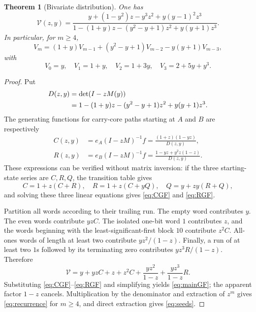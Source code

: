 \documentclass[11pt]{article}
\newtheorem{theorem}{Theorem}[section]
\theoremstyle{definition}\newtheorem{definition}[theorem]{Definition}
\theoremstyle{remark}\newtheorem{remark}[theorem]{Remark}
\begin{document}
\begin{theorem}[Bivariate distribution]\label{thm:GF}
One has
\begin{equation}\label{eq:mainGF}
 \boxed{\quad
 \mathcal V(z,y)=
 \frac{y+(1-y^2)z-y^3z^2+y(y-1)^2z^3}
 {1-(1+y)z-(y^2-y+1)z^2+y(y+1)z^3}.
 \quad}
\end{equation}
In particular, for $m\geq4$,
\begin{equation}\label{eq:recurrence}
 V_m=(1+y)V_{m-1}+(y^2-y+1)V_{m-2}-y(y+1)V_{m-3},
\end{equation}
with
\begin{equation}\label{eq:seeds}
 V_0=y,\quad V_1=1+y,\quad V_2=1+3y,\quad V_3=2+5y+y^3.
\end{equation}
\end{theorem}
\begin{proof}
Put
\begin{align}
 D(z,y)&=\det(I-zM(y))\notag\\
 &=1-(1+y)z-(y^2-y+1)z^2+y(y+1)z^3.\label{eq:D}
\end{align}
The generating functions for carry-core paths starting at $A$ and $B$
are respectively
\begin{align}
 C(z,y)&=e_A(I-zM)^{-1}f
       =\frac{(1+z)(1-yz)}{D(z,y)},\label{eq:CGF}\\
 R(z,y)&=e_B(I-zM)^{-1}f
       =\frac{1-yz+y^2z(1-z)}{D(z,y)}.\label{eq:RGF}
\end{align}
These expressions can be verified without matrix inversion: if the
three starting-state series are $C,R,Q$, the transition table gives
\[
 C=1+z(C+R),\quad R=1+z(C+yQ),\quad Q=y+zy(R+Q),
\]
and solving these three linear equations gives \eqref{eq:CGF} and
\eqref{eq:RGF}.

Partition all words according to their trailing run. The empty word
contributes $y$. The even words contribute $yzC$. The isolated one-bit
word $1$ contributes $z$, and the words beginning with the
least-significant-first block $10$ contribute $z^2C$. All-ones words of
length at least two contribute $yz^2/(1-z)$. Finally, a run of at least
two $1$s followed by its terminating zero contributes
$yz^3R/(1-z)$. Therefore
\begin{equation}\label{eq:partitionGF}
 \mathcal V=y+yzC+z+z^2C+\frac{yz^2}{1-z}
                         +\frac{yz^3}{1-z}R.
\end{equation}
Substituting \eqref{eq:CGF}--\eqref{eq:RGF} and simplifying yields
\eqref{eq:mainGF}; the apparent factor $1-z$ cancels. Multiplication by
the denominator and extraction of $z^m$ gives \eqref{eq:recurrence} for
$m\geq4$, and direct extraction gives \eqref{eq:seeds}.
\end{proof}
\end{document}
